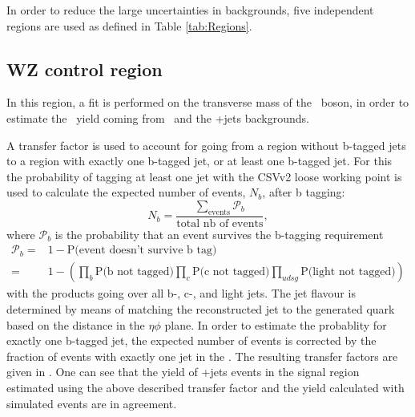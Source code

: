 In order to reduce the large uncertainties in backgrounds, five independent regions are used as defined in Table  \ref{tab:Regions}. 


\subsection{WZ control region}
In this region, a fit is performed on the transverse mass of the \PW\ boson, in order to estimate the \NPL\ yield coming from \DY\ and the \WZ+jets backgrounds. 

A transfer factor is used to account for going from a region without b-tagged jets to a region with exactly one b-tagged jet, or at least one b-tagged jet. For this the probability of tagging at least one jet with the CSVv2 loose working point is used to calculate the expected number of events, $N_b$, after b tagging: 
\begin{equation}
	N_b = \frac{\sum \limits_{\mathrm{events}}\mathcal{P}_b}{\text{total nb of events}},
\end{equation}
where $\mathcal{P}_b$ is the probability that an event survives the b-tagging requirement
\begin{equation}
\begin{aligned}
	\mathcal{P}_b =& 1 - \text{P(event doesn't survive b tag)}\\
	 =& 1 - \left(\prod_{b} \text{P(b not tagged)} \prod_{c} \text{P(c not tagged)} \prod_{udsg} \text{P(light not tagged)}\right)
\end{aligned}
\end{equation}
with the products going over all b-, c-, and light jets. The jet flavour is determined by means of matching the reconstructed jet to the generated quark based on the distance in the $\eta\phi$ plane. In order to estimate the probablity for exactly one b-tagged jet, the expected number of events is corrected by the fraction of events with exactly  one jet in the \WZCR. The resulting transfer factors are given in  . One can see  that the yield of \WZ+jets events in the signal region estimated using the above described transfer factor and the yield calculated with simulated events are in agreement. 

